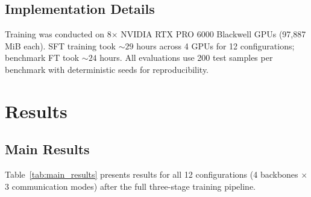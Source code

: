 \documentclass{article}
\begin{document}
\subsection{Implementation Details}

Training was conducted on 8$\times$ NVIDIA RTX PRO 6000 Blackwell GPUs (97,887 MiB each).  SFT training took ${\sim}29$ hours across 4 GPUs for 12 configurations; benchmark FT took ${\sim}24$ hours.  All evaluations use 200 test samples per benchmark with deterministic seeds for reproducibility.

\section{Results}
\label{sec:results}

\subsection{Main Results}

Table~\ref{tab:main_results} presents results for all 12 configurations (4 backbones $\times$ 3 communication modes) after the full three-stage training pipeline.
\end{document}
